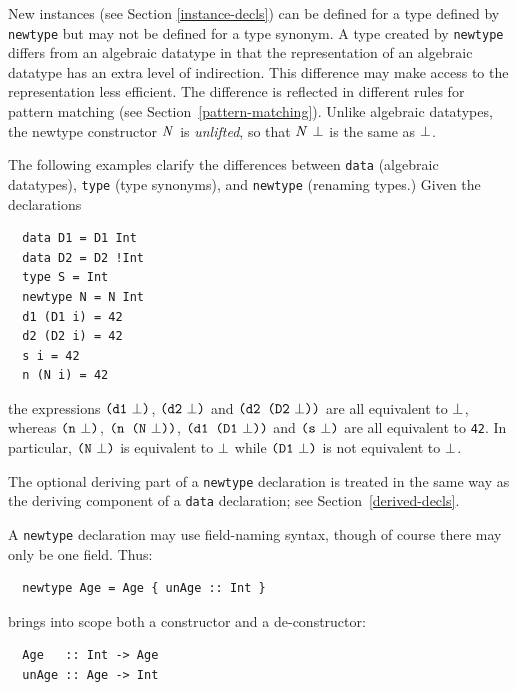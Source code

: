 New instances (see Section \ref{instance-decls}) can be defined for a
type defined by \mbox{\tt newtype} but may not be defined for a type synonym.  A type
created by \mbox{\tt newtype} differs from an algebraic datatype in that the
representation of an
algebraic datatype has an extra level of indirection.  This difference
may make access to the representation less efficient.  The difference is
reflected in different rules for pattern matching (see
Section~\ref{pattern-matching}).  Unlike algebraic datatypes, the
newtype constructor \mbox{$\it N$} is {\em unlifted}, so that \mbox{$\it N\ \bot$}
is the same as \mbox{$\it \bot$}.

The following examples clarify the differences between \mbox{\tt data} (algebraic
datatypes), \mbox{\tt type} (type synonyms), and \mbox{\tt newtype} (renaming types.)
Given the declarations 
\bprog
{\small\begin{verbatim}
  data D1 = D1 Int
  data D2 = D2 !Int
  type S = Int
  newtype N = N Int
  d1 (D1 i) = 42
  d2 (D2 i) = 42
  s i = 42
  n (N i) = 42
\end{verbatim}}
\eprog
the expressions \mbox{$\it \makebox{\tt (d1}\ \bot\makebox{\tt )}$}, \mbox{$\it \makebox{\tt (d2}\ \bot\makebox{\tt )}$} and 
\mbox{$\it \makebox{\tt (d2\ (D2}\ \bot\makebox{\tt ))}$} are all
equivalent to \mbox{$\it \bot$}, whereas \mbox{$\it \makebox{\tt (n}\ \bot\makebox{\tt )}$}, \mbox{$\it \makebox{\tt (n\ (N}\ \bot\makebox{\tt ))}$},
\mbox{$\it \makebox{\tt (d1\ (D1}\ \bot\makebox{\tt ))}$} and \mbox{$\it \makebox{\tt (s}\ \bot\makebox{\tt )}$}
are all equivalent to \mbox{\tt 42}.  In particular, \mbox{$\it \makebox{\tt (N}\ \bot\makebox{\tt )}$} is equivalent to
\mbox{$\it \bot$} while \mbox{$\it \makebox{\tt (D1}\ \bot\makebox{\tt )}$} is not equivalent to \mbox{$\it \bot$}.

The optional deriving part of a \mbox{\tt newtype} declaration is treated in
the same way as the deriving component of a \mbox{\tt data} declaration; see
Section~\ref{derived-decls}.

A \mbox{\tt newtype} declaration may use field-naming syntax, though of course
there may only be one field.  Thus:
\bprog
{\small\begin{verbatim}
  newtype Age = Age { unAge :: Int }
\end{verbatim}}
\eprog
brings into scope both a constructor and a de-constructor:
\bprog
{\small\begin{verbatim}
  Age   :: Int -> Age
  unAge :: Age -> Int
\end{verbatim}}
\eprog

